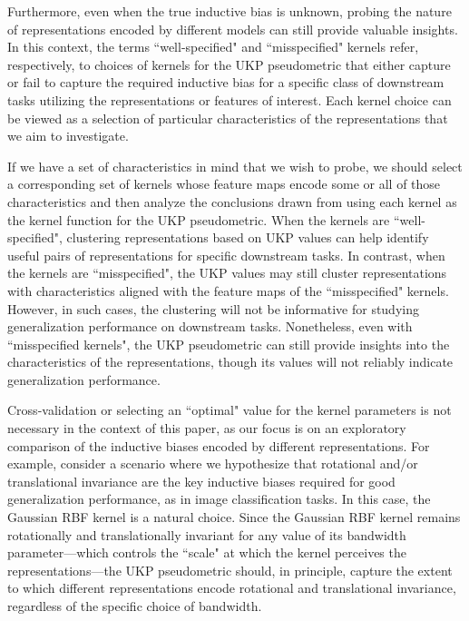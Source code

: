 \documentclass{article} %
\newcommand{\metricstname}{UKP }
\theoremstyle{plain}
\begin{document}
Furthermore, even when the true inductive bias is unknown, probing the nature of representations encoded by different models can still provide valuable insights. In this context, the terms ``well-specified" and ``misspecified" kernels refer, respectively, to choices of kernels for the UKP pseudometric that either capture or fail to capture the required inductive bias for a specific class of downstream tasks utilizing the representations or features of interest. Each kernel choice can be viewed as a selection of particular characteristics of the representations that we aim to investigate.

If we have a set of characteristics in mind that we wish to probe, we should select a corresponding set of kernels whose feature maps encode some or all of those characteristics and then analyze the conclusions drawn from using each kernel as the kernel function for the \metricstname pseudometric. When the kernels are ``well-specified", clustering representations based on \metricstname values can help identify useful pairs of representations for specific downstream tasks. In contrast, when the kernels are ``misspecified", the \metricstname values may still cluster representations with characteristics aligned with the feature maps of the ``misspecified" kernels. However, in such cases, the clustering will not be informative for studying generalization performance on downstream tasks. Nonetheless, even with ``misspecified kernels", the \metricstname pseudometric can still provide insights into the characteristics of the representations, though its values will not reliably indicate generalization performance.

Cross-validation or selecting an ``optimal" value for the kernel parameters is not necessary in the context of this paper, as our focus is on an exploratory comparison of the inductive biases encoded by different representations. For example, consider a scenario where we hypothesize that rotational and/or translational invariance are the key inductive biases required for good generalization performance, as in image classification tasks. In this case, the Gaussian RBF kernel is a natural choice. Since the Gaussian RBF kernel remains rotationally and translationally invariant for any value of its bandwidth parameter—which controls the ``scale" at which the kernel perceives the representations—the \metricstname pseudometric should, in principle, capture the extent to which different representations encode rotational and translational invariance, regardless of the specific choice of bandwidth.
\end{document}
